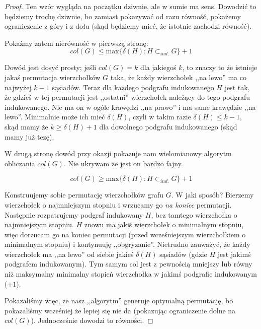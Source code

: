 \begin{proof}
	Ten wzór wygląda na początku dziwnie, ale w sumie ma sens. Dowodzić to będziemy trochę dziwnie, bo zamiast pokazywać od razu równość, pokażemy ograniczenie z góry i z dołu (skąd będziemy mieć, że istotnie zachodzi równość).

	Pokażmy zatem nierówność w pierwszą stronę:
	\begin{equation*}
		col(G) \leq \mathrm{max}\{ \delta(H) : H \subset_{ind.} G \} + 1
	\end{equation*}

	Dowód jest dosyć prosty; jeśli $col(G) = k$ dla jakiegoś $k$, to znaczy to że istnieje jakaś permutacja wierzchołków $G$ taka, że każdy wierzchołek ,,na lewo'' ma  co najwyżej $k-1$ sąsiadów. Teraz dla każdego podgrafu indukowanego $H$ jest tak, że gdzieś w tej permutacji jest ,,ostatni'' wierzchołek należący do tego podgrafu indukowanego. Nie ma on w ogóle krawędzi ,,na prawo'' i ma same krawędzie ,,na lewo''. Minimalnie może ich mieć $\delta(H)$, czyli w takim razie $\delta(H) \leq k - 1$, skąd mamy że $k \geq \delta(H) + 1$ dla dowolnego podgrafu indukowanego (skąd mamy już tezę).

	W drugą stronę dowód przy okazji pokazuje nam wielomianowy algorytm obliczania $col(G)$. Nie ukrywam że jest on bardzo fajny.

	\begin{equation*}
		col(G) \geq \mathrm{max}\{ \delta(H) : H \subset_{ind.} G \} + 1
	\end{equation*}

	Konstruujemy sobie permutację wierzchołków grafu $G$. W jaki sposób? Bierzemy wierzchołek o najmniejszym stopniu i wrzucamy go \textit{na koniec} permutacji. Następnie rozpatrujemy podgraf indukowany $H$, bez tamtego wierzchołka o najmniejszym stopniu. $H$ znowu ma jakiś wierzchołek o minimalnym stopniu, więc dorzucam go na koniec permutacji (przed wcześniejszym wierzchołkiem o minimalnym stopniu) i kontynuuję ,,obgryzanie''. Nietrudno zauważyć, że każdy wierzchołek ma ,,na lewo'' od siebie jakieś $\delta(H)$ sąsiadów (gdzie $H$ jest jakimś podgrafem indukowanym). Tym samym col jest z pewnością mniejszy lub równy niż maksymalny minimalny stopień wierzchołka w jakimś podgrafie indukowanym ($+1$).

	Pokazaliśmy więc, że nasz ,,algorytm'' generuje optymalną permutację, bo pokazaliśmy wcześniej że lepiej się nie da (pokazując ograniczenie dolne na $col(G)$). Jednocześnie dowodzi to równości.
\end{proof}

